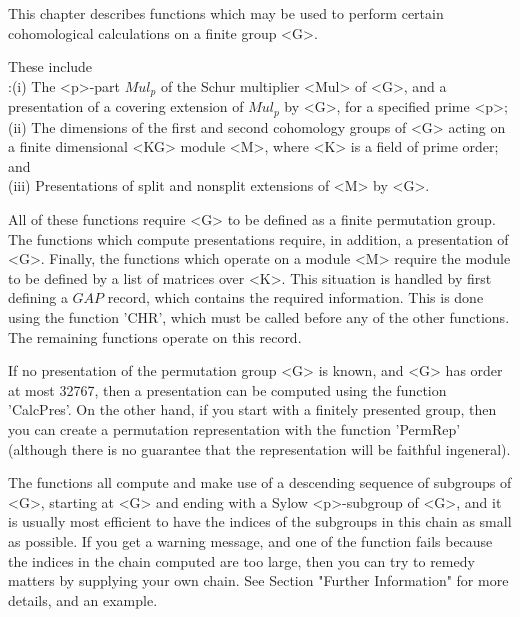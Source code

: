 %

This chapter describes functions which may be used to perform certain
cohomological calculations on a finite group <G>.

These include\:\\
:(i) The <p>-part $Mul_p$ of the Schur multiplier <Mul> of <G>,
and a presentation
of a covering extension of $Mul_p$ by <G>, for a specified prime <p>;\\
(ii) The dimensions of the first and second cohomology groups of <G> acting on
a finite dimensional <KG> module <M>, where <K> is a field of prime order; and\\
(iii) Presentations of split and nonsplit extensions of <M> by <G>.

All of these functions require <G> to be defined as a finite permutation
group. The functions which compute presentations require, in addition, a
presentation of <G>. Finally, the functions which operate on a module <M>
require the module to be defined by a list of matrices over <K>. This
situation is handled by first defining a ${GAP}$ record, which contains the
required information. This is done using the function 'CHR', which must be
called before any of the other functions. The remaining functions operate
on this record.

If no presentation of the permutation group <G> is known, and <G> has
order at most 32767, then a presentation can be computed using the
function 'CalcPres'. On the other hand, if you start with a finitely
presented group, then you can create a permutation representation
with the function 'PermRep' (although there is no guarantee that the
representation will be faithful ingeneral).

The functions all compute and make use of a descending sequence of subgroups
of <G>, starting at <G> and ending with a Sylow <p>-subgroup of <G>, and
it is usually most efficient to have the indices of the subgroups in this
chain as small as possible. If you get a warning message, and one of
the function fails because the indices in the chain computed are too large,
then you can try to remedy matters by supplying your own chain. See
Section "Further Information" for more details, and an example.

